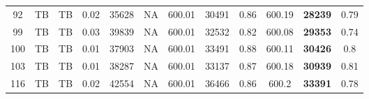 \begin{table*}[]
\begin{tabular}{|c|cc|ccc|ccc|ccc|}
    92                   & TB                                       & TB                                        & 0.02                                   & 35628                                     & NA                                         & 600.01                                 & 30491                                     & 0.86                                       & 600.19                                 & \textbf{28239}                            & 0.79                  \\
    99                   & TB                                       & TB                                        & 0.03                                   & 39839                                     & NA                                         & 600.01                                 & 32532                                     & 0.82                                       & 600.08                                 & \textbf{29353}                            & 0.74                  \\
    100                  & TB                                       & TB                                        & 0.01                                   & 37903                                     & NA                                         & 600.01                                 & 33491                                     & 0.88                                       & 600.11                                 & \textbf{30426}                            & 0.8                   \\
    103                  & TB                                       & TB                                        & 0.01                                   & 38287                                     & NA                                         & 600.01                                 & 33137                                     & 0.87                                       & 600.18                                 & \textbf{30939}                            & 0.81                  \\
    116                  & TB                                       & TB                                        & 0.02                                   & 42554                                     & NA                                         & 600.01                                 & 36466                                     & 0.86                                       & 600.2                                  & \textbf{33391}                            & 0.78                  \\

\end{tabular}
\end{table*}
